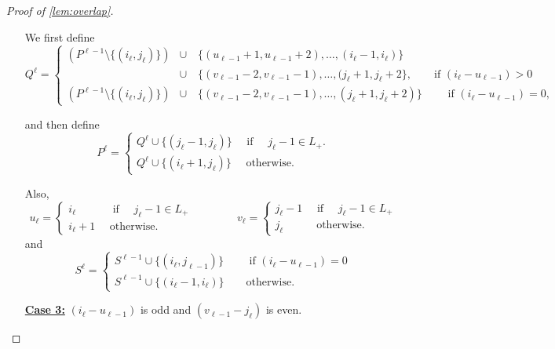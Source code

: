 \documentclass{article}
\begin{document}
\begin{proof}[Proof of \autoref{lem:overlap}]
\begin{enumerate}
        We first define
        \[
            Q^\ell = \begin{cases}
                (P^{\ell-1} \setminus \{(i_\ell, j_\ell)\}) & \cup \quad \{(u_{\ell-1}+1, u_{\ell-1}+2), \ldots, (i_\ell -1, i_\ell)\} \\
                & \cup \quad \{(v_{\ell-1}-2, v_{\ell-1}-1), \ldots, (j_\ell +1, j_\ell +2\}, 
                \qquad \text{if } (i_\ell - u_{\ell-1}) > 0\\
                (P^{\ell-1} \setminus \{(i_\ell, j_\ell)\}) &\cup \quad \{(v_{\ell-1}-2, v_{\ell-1}-1), \ldots, (j_\ell +1, j_\ell +2)\} 
                \qquad \text{ if } (i_\ell - u_{\ell-1}) = 0,
            \end{cases}
        \]
        
        and then define
        \[
            P^\ell = \begin{cases}
                Q^\ell \cup \{(j_\ell -1, j_\ell)\} \quad \text{ if } \quad j_\ell -1 \in L_+.\\
                Q^\ell \cup \{(i_\ell +1, j_\ell)\} \quad \text{ otherwise.} 
                \end{cases} 
        \]
        
        Also,
        \[
            u_\ell = \begin{cases}
                i_\ell \qquad \quad \text{ if } \quad j_\ell -1 \in L_+\\
                i_\ell +1 \quad \text{ otherwise.} 
            \end{cases} 
            \qquad \qquad 
            v_\ell = \begin{cases}
                j_\ell - 1 \quad \text{ if } \quad j_\ell -1 \in L_+\\
                j_\ell \qquad \quad \text{otherwise.} 
            \end{cases} 
        \]
        and
        \[
            S^\ell = \begin{cases}
                S^{\ell -1} \cup \{(i_\ell, j_{\ell -1})\} \qquad \text{ if } (i_\ell - u_{\ell-1}) = 0  \\
                S^{\ell -1} \cup \{(i_\ell -1, i_\ell)\} \qquad \text{otherwise.}
            \end{cases}
        \]
        \item[\underline{\textbf{Case 3:}}] $(i_\ell - u_{\ell-1})$ is odd and $(v_{\ell-1} - j_\ell)$ is even.


\end{enumerate}
\end{proof}
\end{document}
